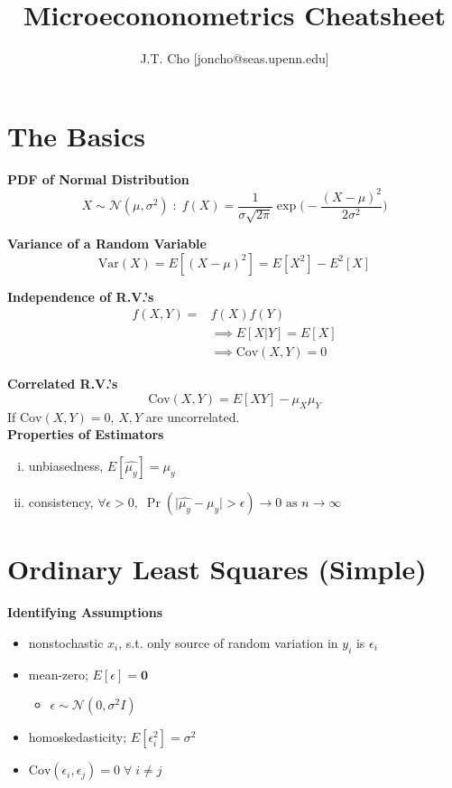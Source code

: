 \documentclass[16pt]{article}
\begin{document}
\title{Microecononometrics Cheatsheet}
\author{J.T. Cho [joncho@seas.upenn.edu]}
\date{}

\maketitle

\section*{The Basics}

\textbf{PDF of Normal Distribution}
$$X \sim \mathcal{N}(\mu, \sigma^2)\;:\; f(X) = \frac{1}{\sigma \sqrt{2\pi}} \exp\bigg(-\frac{(X - \mu)^2}{2\sigma^2}\bigg)$$

\textbf{Variance of a Random Variable}
$$\text{Var}(X) = E[(X - \mu)^2] = E[X^2] - E^2[X]$$

\textbf{Independence of R.V.'s}
\begin{align*}
f(X, Y) =& f(X)f(Y) \\&\implies E[X|Y] = E[X]\\&\implies \text{Cov}(X,Y) = 0
\end{align*}

\textbf{Correlated R.V.'s}
$$\text{Cov}(X,Y) = E[XY] - \mu_X \mu_Y$$
If $\text{Cov}(X,Y) = 0$, $X, Y$ are uncorrelated.\\

\textbf{Properties of Estimators}
\begin{enumerate}[(i)]
  \item unbiasedness, $E[\hat{\mu_y}] = \mu_y$
  \item consistency, $\forall \epsilon > 0,\; \Pr(\mid \hat{\mu_y} - \mu_y \mid > \epsilon) \rightarrow 0 \text{ as } n\rightarrow\infty$
\end{enumerate}

\section*{Ordinary Least Squares (Simple)}

\textbf{Identifying Assumptions}

\begin{itemize}
\item nonstochastic $x_i$, s.t. only source of random variation in $y_i$ is $\epsilon_i$
\item mean-zero; $E[\epsilon] = \mathbf{0}$
\begin{itemize}
  \item $\epsilon \sim \mathcal{N}(0, \sigma^2 I)$
\end{itemize}
\item homoskedasticity; $E[\epsilon_i^2] = \sigma^2$
\item $\text{Cov}(\epsilon_i, \epsilon_j) = 0\;\forall\;i \neq j$
\end{itemize}
\end{document}
